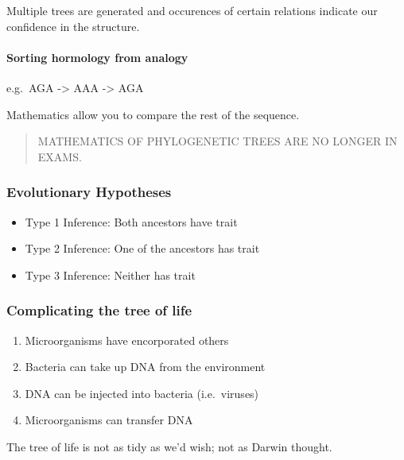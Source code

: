 Multiple trees are generated and occurences of certain relations
indicate our confidence in the structure.

\hypertarget{sorting-hormology-from-analogy}{%
\paragraph{Sorting hormology from
analogy}\label{sorting-hormology-from-analogy}}

e.g.~AGA -\textgreater{} AAA -\textgreater{} AGA

Mathematics allow you to compare the rest of the sequence.

\begin{quote}
MATHEMATICS OF PHYLOGENETIC TREES ARE NO LONGER IN EXAMS.
\end{quote}

\hypertarget{evolutionary-hypotheses}{%
\subsubsection{Evolutionary Hypotheses}\label{evolutionary-hypotheses}}

\begin{itemize}
\tightlist
\item
  Type 1 Inference: Both ancestors have trait
\item
  Type 2 Inference: One of the ancestors has trait
\item
  Type 3 Inference: Neither has trait
\end{itemize}

\hypertarget{complicating-the-tree-of-life}{%
\subsubsection{Complicating the tree of
life}\label{complicating-the-tree-of-life}}

\begin{enumerate}
\def\labelenumi{\arabic{enumi}.}
\tightlist
\item
  Microorganisms have encorporated others
\item
  Bacteria can take up DNA from the environment
\item
  DNA can be injected into bacteria (i.e.~viruses)
\item
  Microorganisms can transfer DNA
\end{enumerate}

The tree of life is not as tidy as we'd wish; not as Darwin thought.

